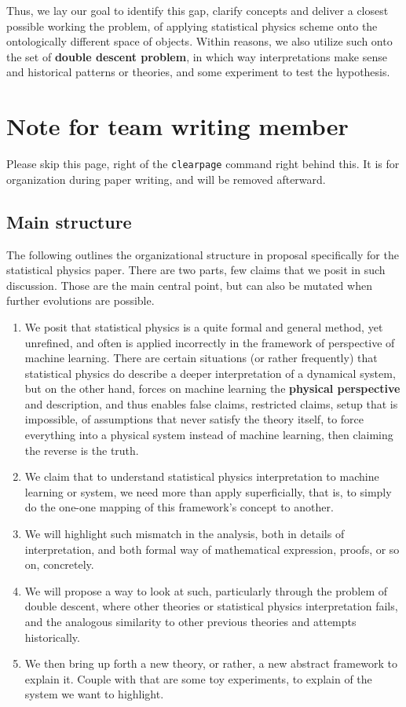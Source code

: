Thus, we lay our goal to identify this gap, clarify concepts and deliver a closest possible working the problem, of applying statistical physics scheme onto the ontologically different space of objects. Within reasons, we also utilize such onto the set of \textbf{double descent problem}, in which way interpretations make sense and historical patterns or theories, and some experiment to test the hypothesis. 

\section{Note for team writing member}

Please skip this page, right of the \texttt{clearpage} command right behind this. It is for organization during paper writing, and will be removed afterward. 

\subsection{Main structure}

The following outlines the organizational structure in proposal specifically for the statistical physics paper. There are two parts, few claims that we posit in such discussion. Those are the main central point, but can also be mutated when further evolutions are possible. 

\begin{enumerate}[topsep=1pt,itemsep=1pt]
    \item We posit that statistical physics is a quite formal and general method, yet unrefined, and often is applied incorrectly in the framework of perspective of machine learning. There are certain situations (or rather frequently) that statistical physics do describe a deeper interpretation of a dynamical system, but on the other hand, forces on machine learning the \textbf{physical perspective} and description, and thus enables false claims, restricted claims, setup that is impossible, of assumptions that never satisfy the theory itself, to force everything into a physical system instead of machine learning, then claiming the reverse is the truth. 
    \item We claim that to understand statistical physics interpretation to machine learning or system, we need more than apply superficially, that is, to simply do the one-one mapping of this framework's concept to another. 
    \item We will highlight such mismatch in the analysis, both in details of interpretation, and both formal way of mathematical expression, proofs, or so on, concretely. 
    \item We will propose a way to look at such, particularly through the problem of double descent, where other theories or statistical physics interpretation fails, and the analogous similarity to other previous theories and attempts historically. 
    \item We then bring up forth a new theory, or rather, a new abstract framework to explain it. Couple with that are some toy experiments, to explain of the system we want to highlight. 
\end{enumerate}

